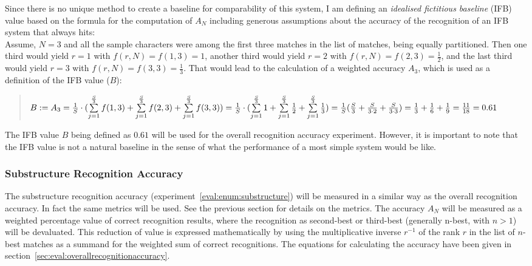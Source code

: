 Since there is no unique method to create a baseline for comparability of 
this system, I am defining an \emph{idealised fictitious baseline} (IFB) 
value based on the formula for the computation of \(A_N\) 
including generous assumptions 
about the accuracy of the recognition of an IFB system that always hits: \\
Assume, \(N = 3\) and all the sample characters were among the first three 
matches in the list of matches, being equally partitioned. 
Then one third would yield \(r = 1\) with \(f(r,N)=f(1,3)=1\),
another third would yield \(r = 2\) with \(f(r,N)=f(2,3)=\frac{1}{2}\),
and the last third would yield \(r = 3\) with \(f(r,N)=f(3,3)=\frac{1}{3}\).
That would lead to the calculation of a weighted accuracy \(A_{3}\),
which is used as a definition of the IFB value (\(B\)):
\begin{quote}
  \(
    B := A_{3} = \frac{1}{S} \cdot (\sum\limits_{j=1}^{\frac{S}{3}}{f(1,3)} + \sum\limits_{j=1}^{\frac{S}{3}}{f(2,3)} + \sum\limits_{j=1}^{\frac{S}{3}}{f(3,3)}) \\
       = \frac{1}{S} \cdot (\sum\limits_{j=1}^{\frac{S}{3}}{1} + \sum\limits_{j=1}^{\frac{S}{3}}{\frac{1}{2}} + \sum\limits_{j=1}^{\frac{S}{3}}{\frac{1}{3}}) \\
       = \frac{1}{S} (\frac{S}{3} + \frac{S}{3 \cdot 2} + \frac{S}{3 \cdot 3}) 
       = \frac{1}{3} + \frac{1}{6} + \frac{1}{9}
       = \frac{11}{18} = 0.61
  \)
\end{quote}
The IFB value \(B\) being defined as \(0.61\) will be used for the overall 
recognition accuracy experiment. However, it is important to note that the 
IFB value is not a natural baseline in the sense of what the performance of a 
most simple system would be like.

\subsubsection{Substructure Recognition Accuracy}
\label{sec:eval:substructurerecognitionaccuracy}

The substructure recognition accuracy (experiment~\ref{eval:enum:substructure})
will be measured in a similar way as the overall recognition accuracy.
In fact the same metrics will be used. See the previous section for details
on the metrics. The accuracy \(A_{N}\) will be measured as a weighted percentage 
value of correct recognition results, where the recognition as second-best or 
third-best (generally n-best, with \(n>1\)) will be devaluated. %
This reduction of value is expressed mathematically by using the multiplicative 
inverse \(r^{-1}\) of the rank \(r\) in the list of \(n\)-best 
matches as a summand for the weighted sum of correct recognitions.
The equations for calculating the accuracy have been given in 
section~\ref{sec:eval:overallrecognitionaccuracy}.

